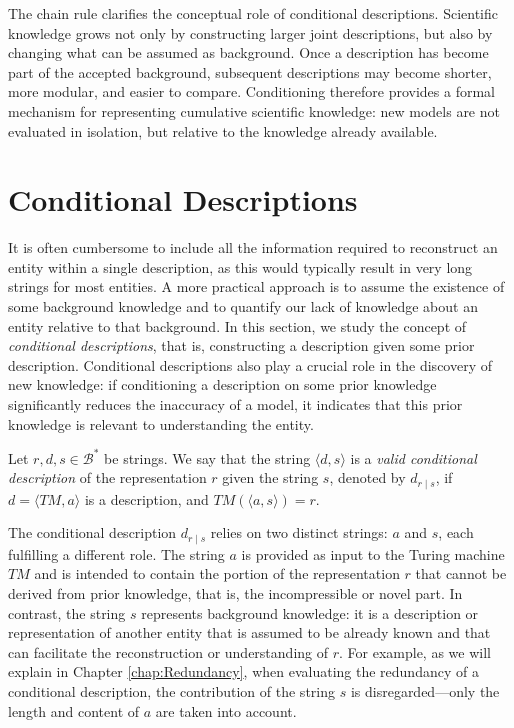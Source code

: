 The chain rule clarifies the conceptual role of conditional descriptions.
Scientific knowledge grows not only by constructing larger joint descriptions,
but also by changing what can be assumed as background. Once a description has
become part of the accepted background, subsequent descriptions may become
shorter, more modular, and easier to compare. Conditioning therefore provides a
formal mechanism for representing cumulative scientific knowledge: new models
are not evaluated in isolation, but relative to the knowledge already available.


\section{Conditional Descriptions}

It is often cumbersome to include all the information required to reconstruct an entity within a single description, as this would typically result in very long strings for most entities. A more practical approach is to assume the existence of some background knowledge and to quantify our lack of knowledge about an entity relative to that background. In this section, we study the concept of \emph{conditional descriptions}, that is, constructing a description given some prior description. Conditional descriptions also play a crucial role in the discovery of new knowledge: if conditioning a description on some prior knowledge significantly reduces the inaccuracy of a model, it indicates that this prior knowledge is relevant to understanding the entity.

\begin{definition}
\label{def:conditional_description}
Let $r, d, s \in \mathcal{B}^\ast$ be strings. We say that the string $\langle d, s \rangle$ is a \emph{valid conditional description} of the representation $r$ given the string $s$, denoted by $d_{r \mid s}$, if $d = \langle TM, a \rangle$ is a description, and $TM \left(\langle a, s \rangle \right) = r$.
\end{definition}

The conditional description $d_{r \mid s}$ relies on two distinct strings: $a$ and $s$, each fulfilling a different role. The string $a$ is provided as input to the Turing machine $TM$ and is intended to contain the portion of the representation $r$ that cannot be derived from prior knowledge, that is, the incompressible or novel part. In contrast, the string $s$ represents background knowledge: it is a description or representation of another entity that is assumed to be already known and that can facilitate the reconstruction or understanding of $r$. For example, as we will explain in Chapter \ref{chap:Redundancy}, when evaluating the redundancy of a conditional description, the contribution of the string $s$ is disregarded—only the length and content of $a$ are taken into account.


